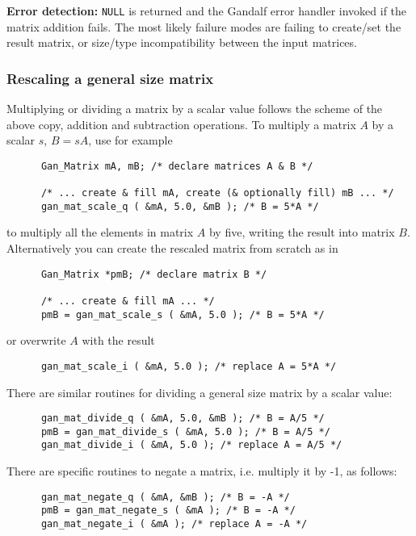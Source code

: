 {\bf Error detection:} {\tt NULL} is returned and the Gandalf error handler
invoked if the matrix addition fails.
The most likely failure modes are failing to create/set the result matrix,
or size/type incompatibility between the input matrices.

\subsubsection{Rescaling a general size matrix}
Multiplying or dividing a matrix by a scalar value follows the scheme of the
above copy, addition and subtraction operations. To multiply a matrix $A$
by a scalar $s$, $B=sA$, use for example
\begin{verbatim}
      Gan_Matrix mA, mB; /* declare matrices A & B */

      /* ... create & fill mA, create (& optionally fill) mB ... */
      gan_mat_scale_q ( &mA, 5.0, &mB ); /* B = 5*A */
\end{verbatim}
to multiply all the elements in matrix $A$ by five, writing the result
into matrix $B$.
Alternatively you can create the rescaled matrix from scratch as in
\begin{verbatim}
      Gan_Matrix *pmB; /* declare matrix B */

      /* ... create & fill mA ... */
      pmB = gan_mat_scale_s ( &mA, 5.0 ); /* B = 5*A */
\end{verbatim}
or overwrite $A$ with the result
\begin{verbatim}
      gan_mat_scale_i ( &mA, 5.0 ); /* replace A = 5*A */
\end{verbatim}

There are similar routines for dividing a general size matrix by a scalar
value:
\begin{verbatim}
      gan_mat_divide_q ( &mA, 5.0, &mB ); /* B = A/5 */
      pmB = gan_mat_divide_s ( &mA, 5.0 ); /* B = A/5 */
      gan_mat_divide_i ( &mA, 5.0 ); /* replace A = A/5 */
\end{verbatim}

There are specific routines to negate a matrix, i.e. multiply it by -1,
as follows:
\begin{verbatim}
      gan_mat_negate_q ( &mA, &mB ); /* B = -A */
      pmB = gan_mat_negate_s ( &mA ); /* B = -A */
      gan_mat_negate_i ( &mA ); /* replace A = -A */
\end{verbatim}

